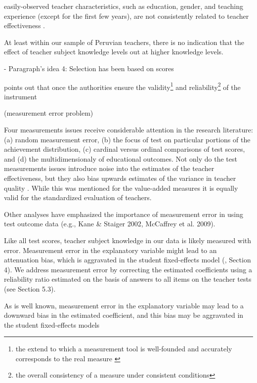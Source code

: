 easily-observed teacher characteristics, such as education, gender, and teaching experience (except for the first few years), are not consistently related to teacher effectiveness \citep{Hanushek_et_al_2006}.


At least within our sample of Peruvian teachers, there is no indication that the effect of teacher subject knowledge levels out at higher knowledge levels. \citep{Metzler_et_al_2012}



- Paragraph's idea 4: Selection has been based on scores

\citet{Hincapie_et_al_2020} points out that once the authorities ensure the validity\footnote{the extend to which a measurement tool is well-founded and accurately corresponds to the real measure \citep{Kelley_1927}} and reliability\footnote{the overall consistency of a measure under consistent conditions} of the instrument 


 (measurement error problem)


Four measurements issues receive considerable attention in the research literature: (a) random measurement error, (b) the focus of test on particular portions of the achievement distribution, (c) cardinal versus ordinal comparisons of test scores, and (d) the multidimensionaly of educational outcomes. Not only do the test measurements issues introduce noise into the estimates of the teacher effectiveness, but they also bias upwards estimates of the variance in teacher quality \citep{Hanushek_et_al_2012}. While this was mentioned for the value-added measures it is equally valid for the standardized evaluation of teachers.


Other analyses have emphasized the importance of measurement error in using test outcome data (e.g., Kane & Staiger 2002, McCaffrey et al. 2009).


Like all test scores, teacher subject knowledge in our data is likely measured with error. Measurement error in the explanatory variable might lead to an attenuation bias, which is aggravated in the student fixed-effects model (\citep{Angrist_et_al_1999}, Section 4). We address measurement error by correcting the estimated coefficients using a reliability ratio estimated on the basis of answers to all items on the teacher tests (see Section 5.3).


As is well known, measurement error in the explanatory variable may lead to a downward bias in the estimated coefficient, and this bias may be aggravated in the student fixed-effects models \citep{Angrist_et_al_1999}


